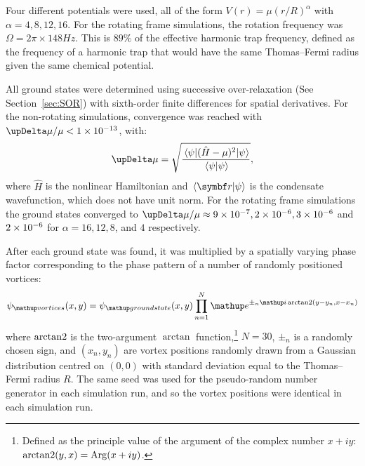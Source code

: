 Four different potentials were used, all of the form $V(r) = \mu \left(r/R\right)^\alpha$ with $\alpha = 4, 8, 12, 16$. For the rotating frame simulations, the rotation frequency was $\Omega = 2\pi \times 148\unit{Hz}$. This is $89\%$ of the effective harmonic trap frequency, defined as the frequency of a harmonic trap that would have the same Thomas--Fermi radius given the same chemical potential.

All ground states were determined using successive over-relaxation (See Section~\ref{sec:SOR}) with sixth-order finite differences for spatial derivatives. For the non-rotating simulations, convergence was reached with $\upDelta\mu/\mu < 1\E{-13}$, with:
\begin{equation}
\upDelta\mu = \sqrt{\frac{\matrixel{\psi} {(\hat H - \mu)^2}{\psi}}{\braket {\psi}{\psi}}},
\end{equation}
where $\hat H$ is the nonlinear Hamiltonian and $\braket{\vec r}{\psi}$ is the condensate wavefunction, which does not have unit norm. For the rotating frame simulations the ground states converged to $\upDelta\mu/\mu \approx 9\E{-7}, 2\E{-6}, 3\E{-6}$ and $2\times 10^{-6}$ for $\alpha = 16, 12, 8$, and $4$ respectively.

After each ground state was found, it was multiplied by a spatially varying phase factor corresponding to the phase pattern of a number of randomly positioned vortices:
\begin{align}
\psi_\up{vortices}(x, y) = \psi_\up{ground state}(x, y)\prod_{n=1}^N \ee^{\pm_n \ii\arctantwo(y - y_n, x - x_n)}
\end{align}
where $\operatorname{arctan2}$ is the two-argument $\arctan$ function,\footnote{Defined as the principle value of the argument of the complex number $x + iy$: \mbox{$\operatorname{arctan2}(y, x) = \operatorname{Arg}(x + iy)$.}} $N=30$, $\pm_n$ is a randomly chosen sign, and $(x_n, y_n)$ are vortex positions randomly drawn from a Gaussian distribution centred on $(0,0)$ with standard deviation equal to the Thomas--Fermi radius $R$. The same seed was used for the pseudo-random number generator in each simulation run, and so the vortex positions were identical in each simulation run.

